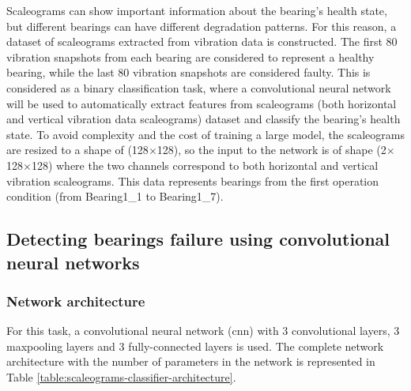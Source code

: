 Scaleograms can show important information about the bearing's health state, but different bearings can have different degradation patterns. For this reason, a dataset of scaleograms extracted from vibration data is constructed. The first 80 vibration snapshots from each bearing are considered to represent a healthy bearing, while the last 80 vibration snapshots are considered faulty. This is considered as a binary classification task, where a convolutional neural network will be used to automatically extract features from scaleograms (both horizontal and vertical vibration data scaleograms) dataset and classify the bearing's health state. To avoid complexity and the cost of training a large model, the scaleograms are resized to a shape of (128$\times$128), so the input to the network is of shape (2$\times$128$\times$128) where the two channels correspond to both horizontal and vertical vibration scaleograms. This data represents bearings from the first operation condition (from Bearing1\_1 to Bearing1\_7).

\subsection{Detecting bearings failure using convolutional neural networks}%
\label{sub:detecting_bearings_failure_using_convolutional_neural_networks}

\subsubsection{Network architecture}%
\label{subsub:network_architecture}
For this task, a convolutional neural network (\acrshort{cnn}) with 3 convolutional layers, 3 maxpooling layers and 3 fully-connected layers is used. The complete network architecture with the number of parameters in the network is represented in Table \ref{table:scaleograms-classifier-architecture}.

